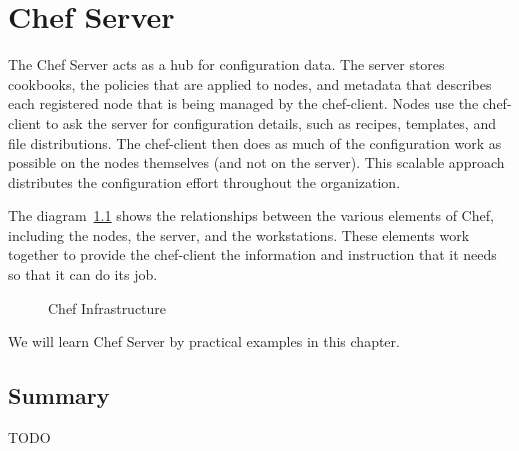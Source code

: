 \chapter{Chef Server}

The Chef Server acts as a hub for configuration data. The server stores cookbooks, the policies that are applied to nodes, and metadata that describes each registered node that is being managed by the chef-client. Nodes use the chef-client to ask the server for configuration details, such as recipes, templates, and file distributions. The chef-client then does as much of the configuration work as possible on the nodes themselves (and not on the server). This scalable approach distributes the configuration effort throughout the organization.

The diagram~\ref{fig:overview_chef_draft} shows the relationships between the various elements of Chef, including the nodes, the server, and the workstations. These elements work together to provide the chef-client the information and instruction that it needs so that it can do its job.

\begin{figure}[ht!]
  \caption{Chef Infrastructure}
  \label{fig:overview_chef_draft}
\end{figure}

We will learn Chef Server by practical examples in this chapter.









\section{Summary}

TODO